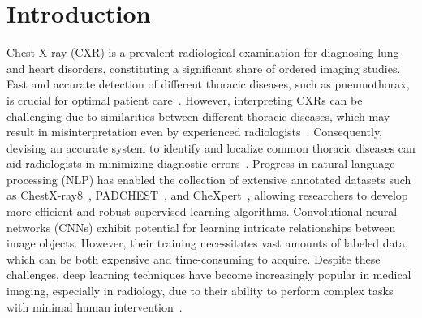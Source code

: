 \documentclass[authoryear,preprint,review,12pt]{elsarticle}
\begin{document}
\begin{frontmatter}


\end{frontmatter}

\section{Introduction}\label{sec:taxonomy.introduction}
Chest X-ray (CXR) is a prevalent radiological examination for diagnosing lung and heart disorders, constituting a significant share of ordered imaging studies. Fast and accurate detection of different thoracic diseases, such as pneumothorax, is crucial for optimal patient care~\cite{bellaviti_Increased_2016}. However, interpreting CXRs can be challenging due to similarities between different thoracic diseases, which may result in misinterpretation even by experienced radiologists~\cite{delrue_Difficulties_2011}. Consequently, devising an accurate system to identify and localize common thoracic diseases can aid radiologists in minimizing diagnostic errors~\cite{crisp_Global_2014,silverstein_Most_2016}.
Progress in natural language processing (NLP) has enabled the collection of extensive annotated datasets such as ChestX-ray8~\cite{wang_ChestXRay8_2017}, PADCHEST~\cite{bustos_Padchest_2020}, and CheXpert~\cite{irvin_CheXpert_2019}, allowing researchers to develop more efficient and robust supervised learning algorithms.
Convolutional neural networks (CNNs) exhibit potential for learning intricate relationships between image objects. However, their training necessitates vast amounts of labeled data, which can be both expensive and time-consuming to acquire. Despite these challenges, deep learning techniques have become increasingly popular in medical imaging, especially in radiology, due to their ability to perform complex tasks with minimal human intervention~\cite{jaderberg_Spatial_2015}.
\end{document}
